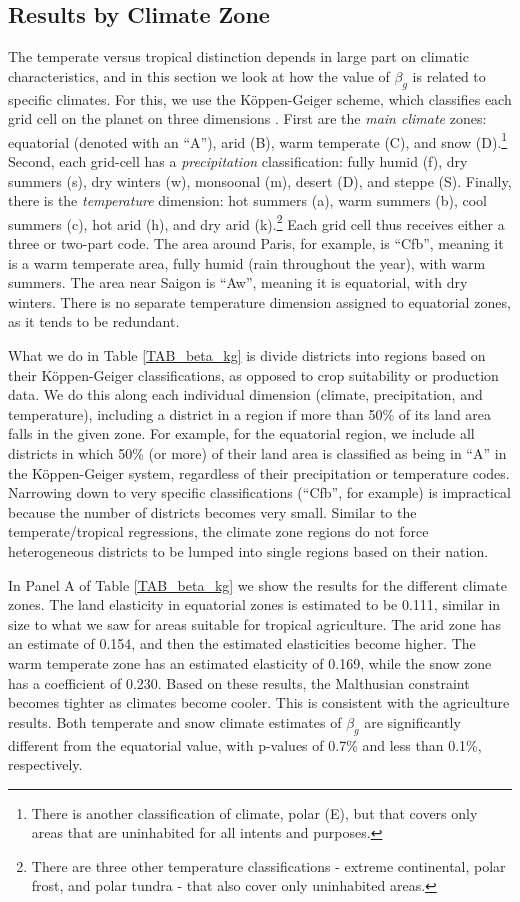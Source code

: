 \subsection{Results by Climate Zone}
The temperate versus tropical distinction depends in large part on climatic characteristics, and in this section we look at how the value of $\beta_g$ is related to specific climates. For this, we use the K{\"o}ppen-Geiger scheme, which classifies each grid cell on the planet on three dimensions \citep{kottek2006}. First are the \textit{main climate} zones: equatorial (denoted with an ``A''), arid (B), warm temperate (C), and snow (D).\footnote{There is another classification of climate, polar (E), but that covers only areas that are uninhabited for all intents and purposes.} Second, each grid-cell has a \textit{precipitation} classification: fully humid (f), dry summers (s), dry winters (w), monsoonal (m), desert (D), and steppe (S). Finally, there is the \textit{temperature} dimension: hot summers (a), warm summers (b), cool summers (c), hot arid (h), and dry arid (k).\footnote{There are three other temperature classifications - extreme continental, polar frost, and polar tundra - that also cover only uninhabited areas.} Each grid cell thus receives either a three or two-part code. The area around Paris, for example, is ``Cfb'', meaning it is a warm temperate area, fully humid (rain throughout the year), with warm summers. The area near Saigon is ``Aw'', meaning it is equatorial, with dry winters. There is no separate temperature dimension assigned to equatorial zones, as it tends to be redundant.

What we do in Table \ref{TAB_beta_kg} is divide districts into regions based on their K{\"o}ppen-Geiger classifications, as opposed to crop suitability or production data. We do this along each individual dimension (climate, precipitation, and temperature), including a district in a region if more than 50\% of its land area falls in the given zone. For example, for the equatorial region, we include all districts in which 50\% (or more) of their land area is classified as being in ``A'' in the K{\"o}ppen-Geiger system, regardless of their precipitation or temperature codes. Narrowing down to very specific classifications (``Cfb'', for example) is impractical because the number of districts becomes very small. Similar to the temperate/tropical regressions, the climate zone regions do not force heterogeneous districts to be lumped into single regions based on their nation. 

In Panel A of Table \ref{TAB_beta_kg} we show the results for the different climate zones. The land elasticity in equatorial zones is estimated to be 0.111, similar in size to what we saw for areas suitable for tropical agriculture. The arid zone has an estimate of 0.154, and then the estimated elasticities become higher. The warm temperate zone has an estimated elasticity of 0.169, while the snow zone has a coefficient of 0.230. Based on these results, the Malthusian constraint becomes tighter as climates become cooler. This is consistent with the agriculture results. Both temperate and snow climate estimates of $\beta_g$ are significantly different from the equatorial value, with p-values of 0.7\% and less than 0.1\%, respectively.

